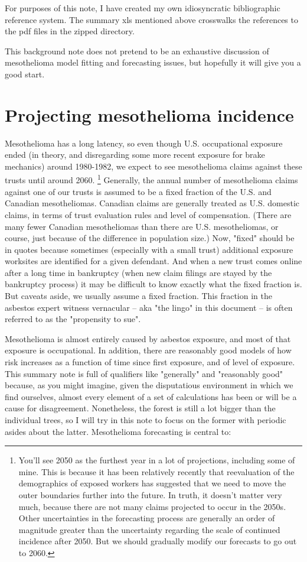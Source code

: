 \documentclass{article}\usepackage{graphicx, color}
\begin{document}
For purposes of this note, I have created my own idiosyncratic bibliographic reference system.  The summary xls mentioned above crosswalks the references to the pdf files in the zipped directory.

This background note does not pretend to be an exhaustive discussion of mesothelioma model fitting and forecasting issues, but hopefully it will give you a good start.


\section{Projecting mesothelioma incidence}

Mesothelioma has a long latency, so even though U.S. occupational exposure ended (in theory, and disregarding some more recent exposure for brake mechanics) around 1980-1982, we expect to see mesothelioma claims against these trusts until around 2060.  \footnote{ You'll see 2050 as the furthest year in a lot of projections, including some of mine.  This is because it has been relatively recently that reevaluation of the demographics of exposed workers has suggested that we need to move the outer boundaries further into the future.  In truth, it doesn't matter very much, because there are not many claims projected to occur in the 2050s.  Other uncertainties in the forecasting process are generally an order of magnitude greater than the uncertainty regarding the scale of continued incidence after 2050.  But we should gradually modify our forecasts to go out to 2060.}  Generally, the annual number of mesothelioma claims against one of our trusts is assumed to be a fixed fraction of the U.S. and Canadian mesotheliomas.  Canadian claims are generally treated as U.S. domestic claims, in terms of trust evaluation rules and level of compensation.  (There are many fewer Canadian mesotheliomas than there are U.S. mesotheliomas, or course, just because of the difference in population size.)  Now, "fixed" should be in quotes because sometimes (especially with a small trust) additional exposure worksites are identified for a given defendant.  And when a new trust comes online after a long time in bankruptcy (when new claim filings are stayed by the bankruptcy process) it may be difficult to know exactly what the fixed fraction is.  But caveats aside, we usually assume a fixed fraction.  This fraction in the asbestos expert witness vernacular -- aka "the lingo" in this document -- is often referred to as the "propensity to sue".

Mesothelioma is almost entirely caused by asbestos exposure, and most of that exposure is occupational.  In addition, there are reasonably good models of how risk increases as a function of time since first exposure, and of level of exposure.  This summary note is full of qualifiers like "generally" and "reasonably good" because, as you might imagine, given the disputatious environment in which we find ourselves, almost every element of a set of calculations has been or will be a cause for disagreement.  Nonetheless, the forest is still a lot bigger than the individual trees, so I will try in this note to focus on the former with periodic asides about the latter.   Mesothelioma forecasting is central to:
\end{document}
